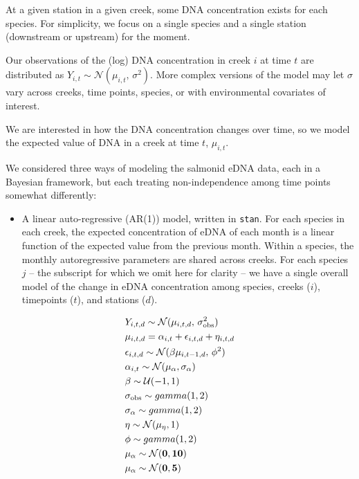 \documentclass[
]{article}
\providecommand{\tightlist}{%
  \setlength{\itemsep}{0pt}\setlength{\parskip}{0pt}}
\begin{document}
At a given station in a given creek, some DNA concentration exists for
each species. For simplicity, we focus on a single species and a single
station (downstream or upstream) for the moment.

Our observations of the (log) DNA concentration in creek \(i\) at time
\(t\) are distributed as
\(Y_{i,t} \sim \mathcal{N}(\mu_{i,t},\,\sigma^{2})\). More complex
versions of the model may let \(\sigma\) vary across creeks, time
points, species, or with environmental covariates of interest.

We are interested in how the DNA concentration changes over time, so we
model the expected value of DNA in a creek at time \(t\), \(\mu_{i,t}\).

We considered three ways of modeling the salmonid eDNA data, each in a
Bayesian framework, but each treating non-independence among time points
somewhat differently:

\begin{itemize}
\tightlist
\item
  A linear auto-regressive (AR(1)) model, written in \texttt{stan}. For
  each species in each creek, the expected concentration of eDNA of each
  month is a linear function of the expected value from the previous
  month. Within a species, the monthly autoregressive parameters are
  shared across creeks. For each species \(j\) -- the subscript for
  which we omit here for clarity -- we have a single overall model of
  the change in eDNA concentration among species, creeks (\(i\)),
  timepoints (\(t\)), and stations (\(d\)).
\end{itemize}

\begin{align*}
&Y_{i,t,d} \sim \mathcal{N}(\mu_{i,t,d},\,\sigma_{\text{obs}}^{2})\\
&\mu_{i,t,d} = \alpha_{i,t} + \epsilon_{i,t,d} + \eta_{i,t,d}\\
&\epsilon_{i,t,d} \sim \mathcal{N}(\beta\mu_{i,t-1,d},\, \phi^2)\\
&\alpha_{i,t} \sim \mathcal{N}(\mu_{\alpha}, \sigma_{\alpha})\\
&\beta \sim \mathcal{U}(-1, 1) \\
&\sigma_{\text{obs}} \sim gamma(1,2) \\
&\sigma_{\alpha} \sim gamma(1,2) \\
&\eta \sim \mathcal{N}(\mu_{\eta}, 1) \\
&\phi \sim gamma(1,2) \\
&\bf{\mu_{\alpha}} \sim \mathcal{N}(0, 10) \\
&\bf{\mu_{\alpha}} \sim \mathcal{N}(0, 5)
\end{align*}
\end{document}
